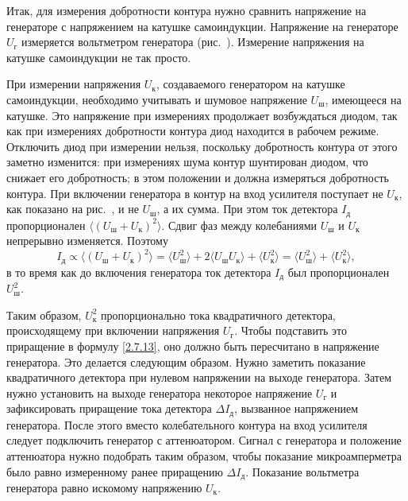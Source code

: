 Итак, для измерения добротности контура нужно сравнить напряжение на генераторе с напряжением на катушке самоиндукции.
Напряжение на генераторе $U_{\text{г}}$ измеряется вольтметром генератора (рис.~). Измерение напряжения на катушке самоиндукции
не так просто.

При измерении напряжения $U_{\text{к}}$, создаваемого генератором на катушке самоиндукции, необходимо учитывать и шумовое
напряжение $U_{\text{ш}}$, имеющееся на катушке. Это напряжение при измерениях продолжает возбуждаться диодом, так как при
измерениях добротности контура диод находится в рабочем режиме. Отключить диод при измерении нельзя, поскольку
добротность контура от этого заметно изменится: при измерениях шума контур шунтирован диодом, что снижает его
добротность; в этом положении и должна измеряться добротность контура. При включении генератора в контур на вход
усилителя поступает не $U_{\text{к}}$, как показано на рис.~, и не $U_{\text{ш}}$, а их сумма. При этом ток детектора $I_{\text{д}}$ пропорционален
$\langle (U_{\text{ш}}+U_{\text{к}})^2\rangle$. Сдвиг фаз между колебаниями $U_{\text{ш}}$ и $U_{\text{к}}$ непрерывно изменяется. Поэтому
\begin{equation*}
I_{\text{д}}\propto\langle (U_{\text{ш}}+U_{\text{к}})^2\rangle=\langle U_{\text{ш}}^2\rangle+2\langle U_{\text{ш}}U_{\text{к}}\rangle+\langle U_{\text{к}}^2\rangle=\langle U_{\text{ш}}^2\rangle+\langle U_{\text{к}}^2\rangle,
\end{equation*}
в то время как до включения генератора ток детектора $I_{\text{д}}$ был пропорционален $U_{\text{ш}}^2$.

Таким образом, $U_{\text{к}}^2$ пропорционально  тока квадратичного детектора, происходящему при включении
напряжения $U_{\text{г}}$. Чтобы подставить это приращение в формулу \eqref{2.7.13}, оно должно быть пересчитано в напряжение
генератора. Это делается следующим образом. Нужно заметить показание квадратичного детектора при нулевом напряжении на
выходе генератора. Затем нужно установить на выходе генератора некоторое напряжение $U_{\text{г}}$ и зафиксировать приращение
тока детектора $\Delta I_{\text{д}}$, вызванное напряжением генератора. После этого вместо колебательного контура на вход усилителя
следует подключить генератор с аттенюатором. Сигнал с генератора и положение аттенюатора нужно подобрать таким образом,
чтобы показание микроамперметра было равно измеренному ранее приращению $\Delta I_{\text{д}}$. Показание вольтметра генератора равно
искомому напряжению $U_{\text{к}}$.

